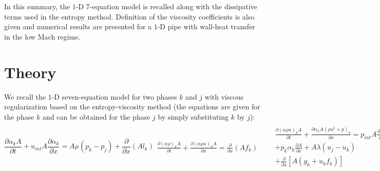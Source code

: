 \documentclass{anstrans}
\begin{document}
In this summary, the $1$-D 7-equation model is recalled along with the dissipative terms used 
in the entropy method. Definition of the viscosity coefficients is also given and numerical 
results are presented for a $1$-D pipe with wall-heat transfer in the low Mach regime.
%
\section{Theory}
%
We recall the $1$-D seven-equation model for two phases $k$ and $j$ with viscous regularization  based on the entropy-viscosity 
method (the equations are given for the phase $k$ and can be obtained for the phase $j$ by simply substituting $k$ by $j$):
\begin{subequations}
\label{eq:euler_visc}
%
\begin{equation}\label{eq:vf_eq}
  \frac{\partial \alpha_{k} A}{\partial t} + u_{int} A \frac{\partial \alpha_{k}}{\partial x}
  = A \mu (p_{k} - p_{j}) + \boxed{\frac{\partial }{\partial x} \left( A l_k  \right)}
\end{equation}
%
\begin{eqnarray}
  \frac{\partial \left( \alpha \rho \right)_{k} A}{\partial t}
  + \frac{\partial \left( \alpha \rho u \right)_{k} A}{\partial x}
  = \boxed{\frac{\partial }{\partial x} \left( A f_k \right)}
\end{eqnarray}
%
\begin{eqnarray}
 && \frac{\partial \left( \alpha \rho u \right)_{k} A}{\partial t}
  + \frac{\partial \alpha_{k} A \left( \rho u^2 + p \right)_{k} }{\partial x}   = p_{int} A \frac{\partial \alpha_{k}}{\partial x} \nonumber \\
 &&+ p_{k} \alpha_{k} \frac{\partial A}{\partial x}
  + A \lambda (u_{j} - u_{k}) \nonumber \\
 && + \boxed{\frac{\partial }{\partial x} \left[ A \left( g_k + u_k f_k \right) \right] }
\end{eqnarray}
%
\begin{eqnarray}
 &&\frac{\partial \left( \alpha \rho E \right)_{k} A}{\partial t}
  + \frac{\partial \alpha_{k} u_{k} A \left( \rho E + p \right)_{k}}{\partial x}
  = p_{int} u_{int} A \frac{\partial \alpha_{k}}{\partial x} 
  \nonumber \\
  &&- \bar{p}_{int} A \mu (p_{k} - p_{j})+ \bar{u}_{int} A \lambda (u_{j} - u_{k})
  \nonumber \\
 && + \boxed{\frac{\partial }{\partial x} \left[ A \left( h_k + u_k g_k - \frac{u_k^2}{2}f_k + \rho_k e_k l_k\right) \right] }
\end{eqnarray}
%
\end{subequations}
\end{document}
